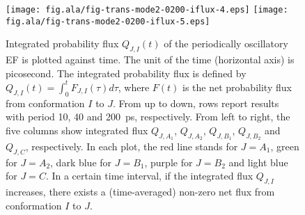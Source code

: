 \documentclass[a4paper,preprint,unsortedaddress,onecolumn]{revtex4-1}
\begin{document}
\begin{figure}
  \texttt{[image: fig.ala/fig-trans-mode2-0200-iflux-4.eps]}
  \texttt{[image: fig.ala/fig-trans-mode2-0200-iflux-5.eps]}\\
  \caption{
    Integrated probability flux $Q_{J,I}(t)$ of the periodically
    oscillatory EF is plotted against time. The unit of the
    time (horizontal axis) is picosecond.
    The integrated
    probability flux is defined by $Q_{J,I}(t) = \int_0^t F_{J,I}(\tau) d\tau$, where
    $F(t)$ is the net probability flux from conformation $I$ to $J$.
    From up to down, rows report results with  period 10, 40 and 200~ps, respectively.
    From left to right, the five
    columns show integrated flux $Q_{J,A_1}$, $Q_{J,A_2}$,
    $Q_{J,B_1}$, $Q_{J,B_2}$ and $Q_{J,C}$, respectively. In each plot,
    the red line stands for $J=A_1$, green for $J=A_2$, dark blue for $J=B_1$,
    purple for $J=B_2$ and light blue for $J=C$. In a certain time interval,
    if the integrated flux $Q_{J,I}$ increases, there exists a (time-averaged)
    non-zero net flux from conformation $I$ to $J$.
  }
  \label{fig:tmp10}
\end{figure}
\end{document}
